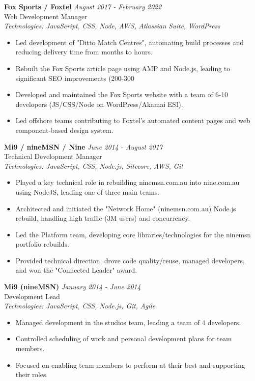 \documentclass[a4paper,10pt]{article}
\begin{document}
\textbf{Fox Sports / Foxtel} \hfill \textit{August 2017 - February 2022} \\
Web Development Manager \\
\textit{Technologies: JavaScript, CSS, Node, AWS, Atlassian Suite, WordPress}
\begin{itemize}
    \item Led development of "Ditto Match Centres", automating build processes and reducing delivery time from months to hours.
    \item Rebuilt the Fox Sports article page using AMP and Node.js, leading to significant SEO improvements (200-300%
    \item Developed and maintained the Fox Sports website with a team of 6-10 developers (JS/CSS/Node on WordPress/Akamai ESI).
    \item Led offshore teams contributing to Foxtel's automated content pages and web component-based design system.
\end{itemize}

\textbf{Mi9 / nineMSN / Nine} \hfill \textit{June 2014 - August 2017} \\
Technical Development Manager \\
\textit{Technologies: JavaScript, CSS, Node.js, Sitecore, AWS, Git}
\begin{itemize}
    \item Played a key technical role in rebuilding ninemsn.com.au into nine.com.au using NodeJS, leading one of three main teams.
    \item Architected and initiated the "Network Home" (ninemsn.com.au) Node.js rebuild, handling high traffic (3M users) and concurrency.
    \item Led the Platform team, developing core libraries/technologies for the ninemsn portfolio rebuilds.
    \item Provided technical direction, drove code quality/reuse, managed developers, and won the "Connected Leader" award.
\end{itemize}

\textbf{Mi9 (nineMSN)} \hfill \textit{January 2014 - June 2014} \\
Development Lead \\
\textit{Technologies: JavaScript, CSS, Node.js, Git, Agile}
\begin{itemize}
    \item Managed development in the studios team, leading a team of 4 developers.
    \item Controlled scheduling of work and personal development plans for team members.
    \item Focused on enabling team members to perform at their best and supporting their roles.
\end{itemize}
\end{document}
